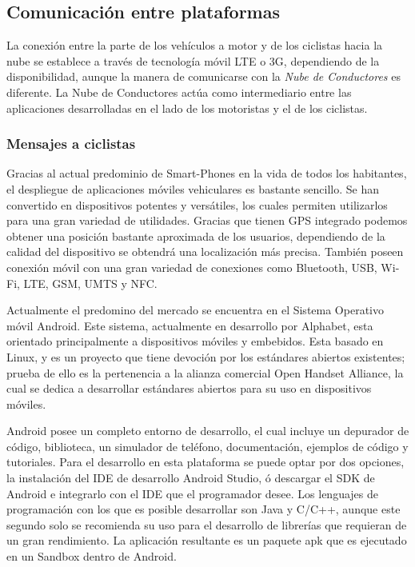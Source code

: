 \subsection{Comunicación entre plataformas}\label{ssection:comunicacion_plataformas}
La conexión entre la parte de los vehículos a motor y de los ciclistas hacia la nube se establece a través de tecnología móvil \gls{LTE} o \gls{3G}, dependiendo de la disponibilidad, aunque la manera de comunicarse con la \emph{Nube de Conductores} es diferente. La Nube de Conductores actúa como intermediario entre las aplicaciones desarrolladas en el lado de los motoristas y el de los ciclistas.

\subsubsection{Mensajes a ciclistas}\label{sssection:mensajes_ciclistas}
Gracias al actual predominio de Smart-Phones en la vida de todos los habitantes, el despliegue de aplicaciones móviles vehiculares es bastante sencillo. Se han convertido en dispositivos potentes y versátiles, los cuales permiten utilizarlos para una gran variedad de utilidades. Gracias que tienen GPS integrado podemos obtener una posición bastante aproximada de los usuarios, dependiendo de la calidad del dispositivo se obtendrá una localización más precisa. También poseen conexión móvil con una gran variedad de conexiones como Bluetooth, USB, Wi-Fi, LTE, GSM, UMTS y NFC.

Actualmente el predomino del mercado se encuentra en el Sistema Operativo móvil Android. Este sistema, actualmente en desarrollo por Alphabet, esta orientado principalmente a dispositivos móviles y embebidos. Esta basado en Linux, y es un proyecto que tiene devoción por los estándares abiertos existentes; prueba de ello es la pertenencia a la alianza comercial Open Handset Alliance, la cual se dedica a desarrollar estándares abiertos para su uso en dispositivos móviles. 

Android posee un completo entorno de desarrollo, el cual incluye un depurador de código, biblioteca, un simulador de teléfono, documentación, ejemplos de código y tutoriales. Para el desarrollo en esta plataforma se puede optar por dos opciones, la instalación del IDE de desarrollo Android Studio, ó descargar el SDK de Android e integrarlo con el IDE que el programador desee. Los lenguajes de programación con los que es posible desarrollar son Java y C/C++, aunque este segundo solo se recomienda su uso para el desarrollo de librerías que requieran de un gran rendimiento. La aplicación resultante es un paquete apk que es ejecutado en un Sandbox dentro de Android.

